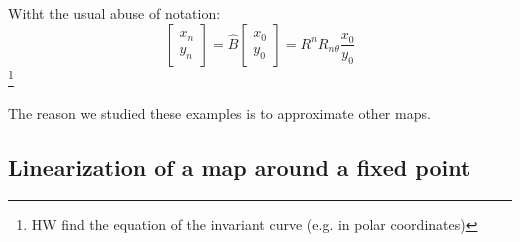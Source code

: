 \begin{example}
    Witht the usual abuse of notation: \begin{equation*} \begin{bmatrix}
        x_n \\ y_n
         \end{bmatrix}
    =\hat{B}\begin{bmatrix}
        x_0 \\ y_0   \end{bmatrix}=R^n R_{n\theta}\frac{x_0}{y_0} \end{equation*}
    \footnote{HW find the equation of the invariant curve (e.g. in polar coordinates)}
\end{example}

The reason we studied these examples is to approximate other maps.

\subsection{Linearization of a map around a fixed point}


